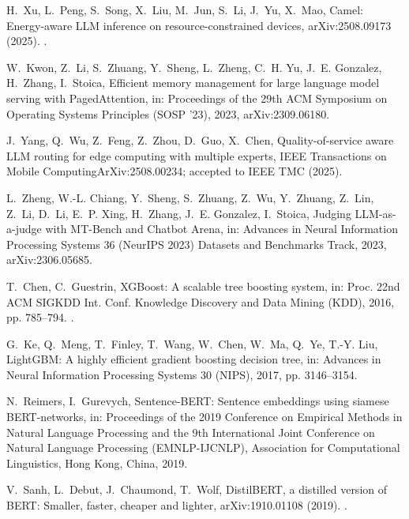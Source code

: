 \documentclass[final,5p,times,twocolumn]{elsarticle}
\theoremstyle{plain}
\begin{document}
H.~Xu, L.~Peng, S.~Song, X.~Liu, M.~Jun, S.~Li, J.~Yu, X.~Mao, {Camel}:
  Energy-aware {LLM} inference on resource-constrained devices,
  arXiv:2508.09173 (2025).
\newblock \href {http://arxiv.org/abs/2508.09173} {}.

W.~Kwon, Z.~Li, S.~Zhuang, Y.~Sheng, L.~Zheng, C.~H. Yu, J.~E. Gonzalez,
  H.~Zhang, I.~Stoica, Efficient memory management for large language model
  serving with {PagedAttention}, in: Proceedings of the 29th ACM Symposium on
  Operating Systems Principles (SOSP '23), 2023, arXiv:2309.06180.

J.~Yang, Q.~Wu, Z.~Feng, Z.~Zhou, D.~Guo, X.~Chen, Quality-of-service aware
  {LLM} routing for edge computing with multiple experts, IEEE Transactions on
  Mobile ComputingArXiv:2508.00234; accepted to IEEE TMC (2025).

L.~Zheng, W.-L. Chiang, Y.~Sheng, S.~Zhuang, Z.~Wu, Y.~Zhuang, Z.~Lin, Z.~Li,
  D.~Li, E.~P. Xing, H.~Zhang, J.~E. Gonzalez, I.~Stoica, Judging
  {LLM}-as-a-judge with {MT-Bench} and {Chatbot Arena}, in: Advances in Neural
  Information Processing Systems 36 (NeurIPS 2023) Datasets and Benchmarks
  Track, 2023, arXiv:2306.05685.

T.~Chen, C.~Guestrin, {XGBoost}: A scalable tree boosting system, in: Proc.
  22nd ACM SIGKDD Int. Conf. Knowledge Discovery and Data Mining (KDD), 2016,
  pp. 785--794.
\newblock \href {https://doi.org/10.1145/2939672.2939785}
  {}.

G.~Ke, Q.~Meng, T.~Finley, T.~Wang, W.~Chen, W.~Ma, Q.~Ye, T.-Y. Liu,
  {LightGBM}: A highly efficient gradient boosting decision tree, in: Advances
  in Neural Information Processing Systems 30 (NIPS), 2017, pp. 3146--3154.

N.~Reimers, I.~Gurevych, {Sentence-BERT}: Sentence embeddings using siamese
  {BERT}-networks, in: Proceedings of the 2019 Conference on Empirical Methods
  in Natural Language Processing and the 9th International Joint Conference on
  Natural Language Processing (EMNLP-IJCNLP), Association for Computational
  Linguistics, Hong Kong, China, 2019.

V.~Sanh, L.~Debut, J.~Chaumond, T.~Wolf, {DistilBERT}, a distilled version of
  {BERT}: Smaller, faster, cheaper and lighter, arXiv:1910.01108 (2019).
\newblock \href {http://arxiv.org/abs/1910.01108} {}.
\end{document}
